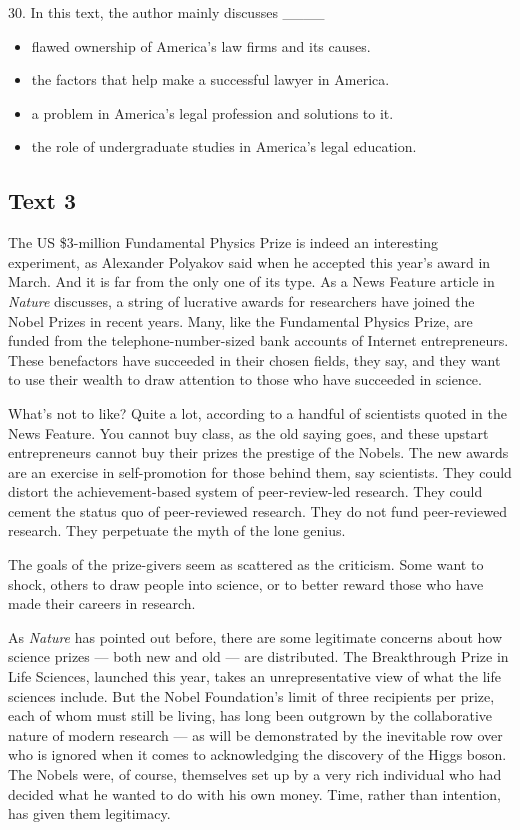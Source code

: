 \documentclass[UTF8,11pt]{ctexart}
\begin{document}
30. In this text, the author mainly discusses \_\_\_\_


\begin{itemize}[leftmargin=2em,itemsep=.2em,topsep=.4em]\item[A.] flawed ownership of America’s law firms and its causes.
\item[B.] the factors that help make a successful lawyer in America.
\item[C.] a problem in America’s legal profession and solutions to it.
\item[D.] the role of undergraduate studies in America’s legal education.
\end{itemize}

\subsection*{\textbf{Text 3}}


The US \$3-million Fundamental Physics Prize is indeed an interesting experiment, as Alexander Polyakov said when he accepted this year’s award in March. And it is far from the only one of its type. As a News Feature article in \textit{Nature} discusses, a string of lucrative awards for researchers have joined the Nobel Prizes in recent years. Many, like the Fundamental Physics Prize, are funded from the telephone-number-sized bank accounts of Internet entrepreneurs. These benefactors have succeeded in their chosen fields, they say, and they want to use their wealth to draw attention to those who have succeeded in science.


What’s not to like? Quite a lot, according to a handful of scientists quoted in the News Feature. You cannot buy class, as the old saying goes, and these upstart entrepreneurs cannot buy their prizes the prestige of the Nobels. The new awards are an exercise in self-promotion for those behind them, say scientists. They could distort the achievement-based system of peer-review-led research. They could cement the status quo of peer-reviewed research. They do not fund peer-reviewed research. They perpetuate the myth of the lone genius.


The goals of the prize-givers seem as scattered as the criticism. Some want to shock, others to draw people into science, or to better reward those who have made their careers in research.


As \textit{Nature} has pointed out before, there are some legitimate concerns about how science prizes — both new and old — are distributed. The Breakthrough Prize in Life Sciences, launched this year, takes an unrepresentative view of what the life sciences include. But the Nobel Foundation’s limit of three recipients per prize, each of whom must still be living, has long been outgrown by the collaborative nature of modern research — as will be demonstrated by the inevitable row over who is ignored when it comes to acknowledging the discovery of the Higgs boson. The Nobels were, of course, themselves set up by a very rich individual who had decided what he wanted to do with his own money. Time, rather than intention, has given them legitimacy.
\end{document}
